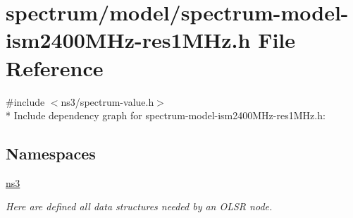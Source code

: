\hypertarget{spectrum-model-ism2400MHz-res1MHz_8h}{}\section{spectrum/model/spectrum-\/model-\/ism2400\+M\+Hz-\/res1\+M\+Hz.h File Reference}
\label{spectrum-model-ism2400MHz-res1MHz_8h}
{\ttfamily \#include $<$ns3/spectrum-\/value.\+h$>$}\\*
Include dependency graph for spectrum-\/model-\/ism2400\+M\+Hz-\/res1\+M\+Hz.h\+:
\subsection*{Namespaces}
\begin{DoxyCompactItemize}
\item 
 \hyperlink{namespacens3}{ns3}
\begin{DoxyCompactList}\small\item\em Here are defined all data structures needed by an O\+L\+SR node. \end{DoxyCompactList}\end{DoxyCompactItemize}

